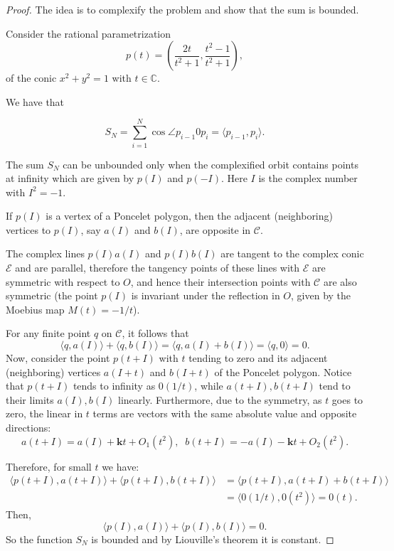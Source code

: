 \begin{proof} The idea is to complexify the problem and show that the sum is bounded.  

Consider the rational parametrization 
\[ p(t)=\left(\frac{2t}{t^2+1},\frac{t^2-1}{t^2+1}\right),\] 
of the conic $x^2+y^2=1 $ with $t\in\mathbb{C}$.

We have that

\[S_N=\sum_{i=1}^N \cos\angle p_{i-1}0p_{i}=\langle p_{i-1}, p_i\rangle. \]

The sum $S_N$ can be unbounded only when the complexified orbit contains   points  at infinity which are given by $p(I)$ and $p(-I)$. Here $I$ is the complex number with $I^2=-1.$

 If $p(I)$ is a vertex of a Poncelet polygon, then the adjacent (neighboring) vertices to $p(I)$, say $a(I)$ and $b(I)$, are opposite in $\mathcal{C}.$

The complex lines $p(I)a(I)$ and $p(I)b(I)$ are tangent to the complex conic $\mathcal{E}$  and are parallel, therefore the tangency
points of these lines with $\mathcal{E}$   are symmetric with respect to $O$, and hence their intersection
points with $\mathcal{C}$  are also symmetric (the point $p(I)$ is invariant under the reflection in $O$,
given by the Moebius map $M(t)= −1/t$).

  For any finite point $q$   on $\mathcal{C}$, it follows that
 \[ \langle  q, a(I)\rangle +\langle q, b(I)\rangle  =  \langle  q, a(I)+b(I)     \rangle=\langle q,0\rangle=
0.\]
 Now, consider the point $p(t +I)$ with $t$  tending to zero and its adjacent (neighboring) vertices
$a(I +t)$ and $ b(I +t)$ of the Poncelet polygon. Notice that $   p(t + I) $ tends to infinity as
$0(1/t)$, while $a(t + I), b(t + I)$ tend to their limits $a(I), b(I)$ linearly. Furthermore,
due to the symmetry, as $t$ goes to zero, the linear in $t$ terms are vectors with the same
absolute value and opposite directions:
\[a(t+I)=a(I)+\mathbf{k} t+O_1(t^2),\;\;b(t+I)=-a(I)-\mathbf{k} t+O_2(t^2).\]

\noindent Therefore, for small $t$ we have:
\begin{align*}
\langle p(t + I ), a(t + I )\rangle + \langle p(t + I ), b(t + I )\rangle & = \langle p(t + I ), a(t + I ) + b(t + I )\rangle\\
&= \langle 0(1/t),0(t^2)\rangle = 0(t).
\end{align*}
Then,
 \[ \langle  p(I), a(I)\rangle +\langle p(I), b(I)\rangle  =   
0.\]
So the function $S_N$ is bounded and by Liouville's theorem it is constant.
\end{proof}

